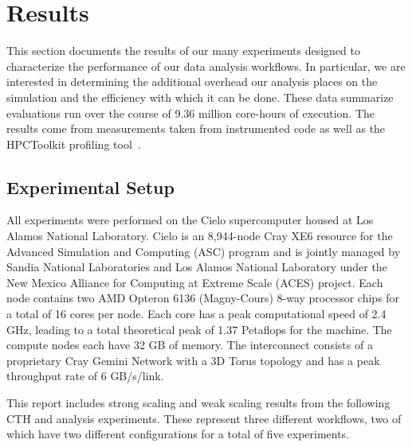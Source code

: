 \section{Results}
\label{sec:Results}

This section documents the results of our many experiments designed to
characterize the performance of our data analysis workflows.  In
particular, we are interested in determining the additional overhead our
analysis places on the simulation and the efficiency with which it can be
done.  These data summarize evaluations run over the course of 9.36 million
core-hours of execution.  The results come from measurements taken from
instrumented code as well as the HPCToolkit profiling
tool~\cite{adhianto:hpctoolkit}.

\subsection{Experimental Setup}

All experiments were performed on the Cielo supercomputer housed at Los Alamos
National Laboratory.  Cielo is an 8,944-node Cray XE6 resource for the Advanced
Simulation and Computing (ASC) program and is jointly managed by Sandia National
Laboratories and Los Alamos National Laboratory under the New Mexico
Alliance for Computing at Extreme Scale (ACES) project.  Each node contains
two AMD Opteron 6136 (Magny-Cours) 8-way processor chips for a total of 16 cores
per node.  Each core has a peak computational speed of 2.4 GHz, leading to a total
theoretical peak of 1.37 Petaflops for the machine. The compute nodes each
have 32 GB of memory.  The interconnect consists of a proprietary Cray Gemini
Network with a 3D Torus topology and has a peak throughput rate of 6 GB/s/link.

This report includes strong scaling and weak scaling results from the
following CTH and analysis experiments.  These represent three different
workflows, two of which have two different configurations for a total of
five experiments.

